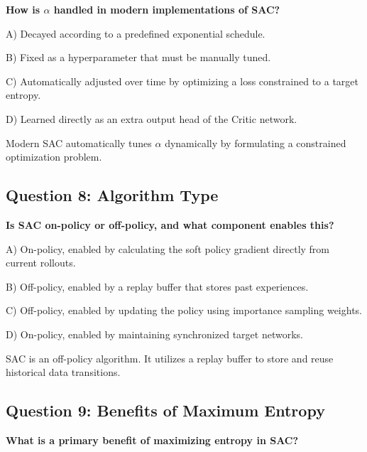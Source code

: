 \documentclass[12pt,a4paper]{article}
\theoremstyle{noteplain}
\theoremstyle{noteexercise}
\begin{document}
\textbf{How is $\alpha$ handled in modern implementations of SAC?}

A) Decayed according to a predefined exponential schedule.

B) Fixed as a hyperparameter that must be manually tuned.

C) Automatically adjusted over time by optimizing a loss constrained to a target entropy.

D) Learned directly as an extra output head of the Critic network.

\begin{keypoint}[Answer: C]

Modern SAC automatically tunes $\alpha$ dynamically by formulating a constrained optimization problem.

\end{keypoint}



\subsection{Question 8: Algorithm Type}\label{ssec:q8}



\textbf{Is SAC on-policy or off-policy, and what component enables this?}

A) On-policy, enabled by calculating the soft policy gradient directly from current rollouts.

B) Off-policy, enabled by a replay buffer that stores past experiences.

C) Off-policy, enabled by updating the policy using importance sampling weights.

D) On-policy, enabled by maintaining synchronized target networks.

\begin{keypoint}[Answer: B]

SAC is an off-policy algorithm. It utilizes a replay buffer to store and reuse historical data transitions.

\end{keypoint}



\subsection{Question 9: Benefits of Maximum Entropy}\label{ssec:q9}



\textbf{What is a primary benefit of maximizing entropy in SAC?}
\end{document}
